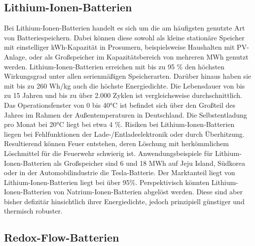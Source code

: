 \subsection{Lithium-Ionen-Batterien}

Bei Lithium-Ionen-Batterien handelt es sich um die am häufigsten genutzte Art von Batteriespeichern. 
Dabei können diese sowohl als kleine stationäre Speicher mit einstelliger kWh-Kapazität in Prosumern, 
beispielsweise Haushalten mit PV-Anlage, oder als Großspeicher im Kapazitätsbereich von mehreren MWh genutzt werden.
Lithium-Ionen-Batterien erreichen mit bis zu 95 \% den höchsten Wirkungsgrad unter allen serienmäßigen Speicherarten. 
Darüber hinaus haben sie mit bis zu 260 Wh/kg auch die höchste Energiedichte. Die Lebensdauer von bis zu 15 Jahren 
und bis zu über 2.000 Zyklen ist vergleichsweise durchschnittlich. 
Das Operationsfenster von 0 bis 40°C ist befindet sich über den Großteil des Jahres im Rahmen der Außentemperaturen 
in Deutschland. Die Selbstentladung pro Monat bei 20°C liegt bei etwa 4 \%\cite{uni-lecture}.
Risiken bei Lithium-Ionen-Batterien liegen bei Fehlfunktionen der Lade-/Entladeelektronik oder durch Überhitzung. 
Resultierend können Feuer entstehen, deren Löschung mit herkömmlichem Löschmittel für die Feuerwehr schwierig ist.
Anwendungsbeispiele für Lithium-Ionen-Batterien als Großspeicher sind 6 und 18 MWh auf Jeju Island, 
Südkorea oder in der Automobilindustrie die Tesla-Batterie. Der Marktanteil liegt von Lithium-Ionen-Batterien liegt bei über 95\%.
Perspektivisch könnten Lithium-Ionen-Batterien von Natrium-Ionen-Batterien abgelöst werden. 
Diese sind aber bisher defizitär hinsichtlich ihrer Energiedichte, jedoch prinzipiell günstiger und thermisch robuster. 

\subsection{Redox-Flow-Batterien}

